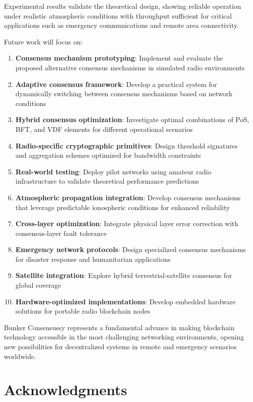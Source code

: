 \documentclass[11pt,a4paper]{article}
\begin{document}
Experimental results validate the theoretical design, showing reliable operation under realistic atmospheric conditions with throughput sufficient for critical applications such as emergency communications and remote area connectivity.

Future work will focus on:
\begin{enumerate}
\item \textbf{Consensus mechanism prototyping}: Implement and evaluate the proposed alternative consensus mechanisms in simulated radio environments
\item \textbf{Adaptive consensus framework}: Develop a practical system for dynamically switching between consensus mechanisms based on network conditions
\item \textbf{Hybrid consensus optimization}: Investigate optimal combinations of PoS, BFT, and VDF elements for different operational scenarios
\item \textbf{Radio-specific cryptographic primitives}: Design threshold signatures and aggregation schemes optimized for bandwidth constraints
\item \textbf{Real-world testing}: Deploy pilot networks using amateur radio infrastructure to validate theoretical performance predictions
\item \textbf{Atmospheric propagation integration}: Develop consensus mechanisms that leverage predictable ionospheric conditions for enhanced reliability
\item \textbf{Cross-layer optimization}: Integrate physical layer error correction with consensus-layer fault tolerance
\item \textbf{Emergency network protocols}: Design specialized consensus mechanisms for disaster response and humanitarian applications
\item \textbf{Satellite integration}: Explore hybrid terrestrial-satellite consensus for global coverage
\item \textbf{Hardware-optimized implementations}: Develop embedded hardware solutions for portable radio blockchain nodes
\end{enumerate}

Bunker Consensussy represents a fundamental advance in making blockchain technology accessible in the most challenging networking environments, opening new possibilities for decentralized systems in remote and emergency scenarios worldwide.

\section*{Acknowledgments}
\end{document}
